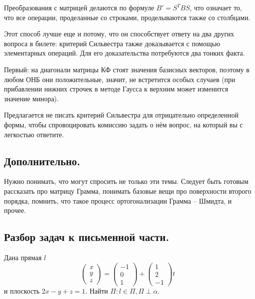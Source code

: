 Преобразования с матрицей делаются по формуле $B' = S^TBS$, что означает то, что все операции, проделанные со строками, проделываются также со столбцами. 

Этот способ лучше еще и потому, что он способствует ответу на два других вопроса в билете: критерий Сильвестра также доказывается с помощью элементарных операций. Для его доказательства потребуются два тонких факта.

Первый: на диагонали матрицы КФ стоят значения базисных векторов, поэтому в любом ОНБ они положительные, значит, не встретится особых случаев (при прибавлении нижних строчек в методе Гаусса к верхним может изменится значение минора). 

Предлагается не писать критерий Сильвестра для отрицательно определенной формы, чтобы спровоцировать комиссию задать о нём вопрос, на который вы с легкостью ответите.

\subsection{Дополнительно.} 

Нужно понимать, что могут спросить не только эти темы. Следует быть готовым рассказать про матрицу Грамма, понимать базовые вещи про поверхности второго порядка, помнить, что такое процесс ортогонализации Грамма -- Шмидта, и прочее.

\subsection{Разбор задач к письменной части.}

\begin{task}
    Дана прямая $l$
    \begin{equation*}
        \begin{pmatrix}
            x \\ y \\ z
        \end{pmatrix} = \begin{pmatrix}
            -1 \\ 0 \\ 1
        \end{pmatrix} + \begin{pmatrix}
            1 \\ 2 \\ -1
        \end{pmatrix}t
    \end{equation*}
    и плоскость $2x - y + z = 1$. Найти $\Pi: l \in \Pi, \Pi \perp \alpha$.
\end{task} 

